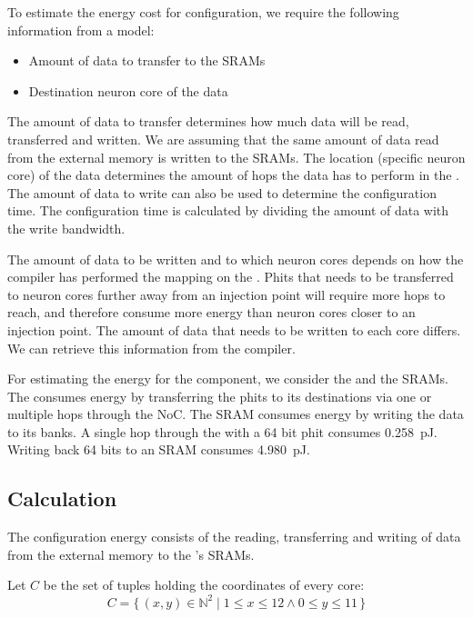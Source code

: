 To estimate the energy cost for configuration, we require the following information from a model:
\begin{itemize}
    \item Amount of data to transfer to the SRAMs
    \item Destination neuron core of the data
\end{itemize}

The amount of data to transfer determines how much data will be read, transferred and written.
We are assuming that the same amount of data read from the external memory is written to the SRAMs.
The location (specific neuron core) of the data determines the amount of hops the data has to perform in the \confignoc{}.
The amount of data to write can also be used to determine the configuration time.
The configuration time is calculated by dividing the amount of data with the write bandwidth.

The amount of data to be written and to which neuron cores depends on how the compiler has performed the mapping on the \graicore{}. %
Phits that needs to be transferred to neuron cores further away from an injection point will require more hops to reach, and therefore consume more energy than neuron cores closer to an injection point.
The amount of data that needs to be written to each core differs.
We can retrieve this information from the compiler.

For estimating the energy for the \graicore{} component, we consider the \confignoc{} and the SRAMs.
The \confignoc{} consumes energy by transferring the phits to its destinations via one or multiple hops through the NoC.
The SRAM consumes energy by writing the data to its banks.
A single hop through the \confignoc{} with a 64 bit phit consumes \SI{0.258}{pJ}.
Writing back 64 bits to an SRAM consumes \SI{4.980}{pJ}.

\subsection{Calculation}
The configuration energy consists of the reading, transferring and writing of data from the external memory to the \graicore{}'s SRAMs. 

Let $C$ be the set of tuples holding the coordinates of every core:
\begin{equation*}
    C = \{\,\left(x,y\right) \in \mathbb{N}^2 \mid 1 \leq x \leq 12 \wedge 0 \leq y \leq 11 \,\} 
\end{equation*}

